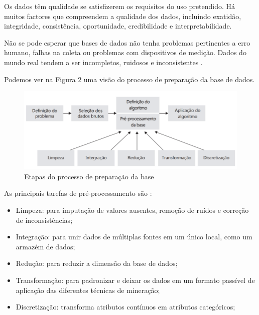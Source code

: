 \documentclass[conference]{IEEEtran}
\begin{document}
    Os dados têm qualidade se satisfizerem os requisitos do uso pretendido. Há muitos factores que compreendem a qualidade dos dados, incluindo exatidão, integridade, consistência, oportunidade, credibilidade e interpretabilidade\cite{mineracao_conceitos_tecnicas}.
      
     Não se pode esperar que bases de dados não tenha problemas pertinentes a erro humano, falhas na coleta ou problemas com dispositivos de medição. Dados do mundo real tendem a ser incompletos, ruidosos e inconsistentes \cite{mineracao_conceitos_tecnicas}. 

    Podemos ver na  Figura 2 uma visão do processo de preparação da base de dados.

\begin{figure}[htbp]
	\centerline{\includegraphics[scale=0.3]{imagens/preprocessamento.png}}
	\caption{Etapas do processo de preparação da base}
	
	\label{fig}
	\end{figure}

As principais tarefas de pré-processamento são  \cite{mineracao_nunes}:
\begin{itemize}
\item Limpeza: para imputação de valores ausentes, remoção de ruídos e correção de inconsistências;
\item Integração: para unir dados de múltiplas fontes em um único local, como um armazém de dados;
\item Redução: para reduzir a dimensão da base de dados;
\item Transformação: para padronizar e deixar os dados em um formato passível de aplicação das diferentes técnicas de mineração;
\item Discretização: transforma atributos contínuos em atributos categóricos;
\end{itemize}
\end{document}
